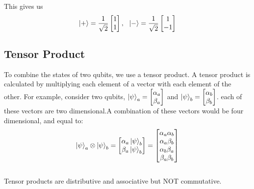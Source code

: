 \documentclass{scrartcl}
\begin{document}
This gives us
\begin{equation}
	 \ket{+}=\frac{1}{\sqrt{2}} \begin{bmatrix} 1 \\ 1 \end{bmatrix}, \ \ \ket{-}=\frac{1}{\sqrt{2}} \begin{bmatrix} 1 \\ -1 \end{bmatrix}\end{equation}\subsection{Tensor Product} 
		 To combine the states of two qubits, we use a tensor product. A tensor product is calculated by multiplying each element of a vector with each element of the other.
		 For example, consider two qubits, $\ket{\psi}_a=\begin{bmatrix} \alpha_a\\ \beta_a \end{bmatrix}$ and $\ket{\psi}_b=\begin{bmatrix} \alpha_b \\ \beta_b \end{bmatrix}$. each of these vectors are two dimensional.A combination of these vectors would be four dimensional, and equal to:
	 \begin{equation} \ket{\psi}_a \otimes \ket{\psi}_b = \begin{bmatrix} \alpha_a \ket{\psi}_b \\  \beta_a \ket{\psi}_b \end{bmatrix} = \begin{bmatrix} \alpha_a \alpha_b \\ \alpha_a \beta_b \\ \alpha_b \beta_a \\ \beta_a \beta_b \end{bmatrix}
			    \end{equation}
\\Tensor products are distributive and associative but NOT commutative. 
\end{document}
